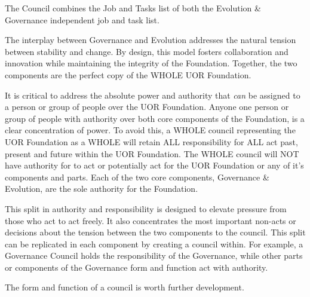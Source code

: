 \documentclass[twocolumn,10pt]{article}
\begin{document}
The Council combines the Job and Tasks list of both the Evolution \& Governance independent job and task list.

The interplay between Governance and Evolution addresses the natural tension between stability and change.
By design, this model fosters collaboration and innovation while maintaining the integrity of the Foundation.
Together, the two components are the perfect copy of the WHOLE UOR Foundation.

It is critical to address the absolute power and authority that \textit{can} be assigned to a person or group of people over the UOR Foundation.
Anyone one person or group of people with authority over both core components of the Foundation, is a clear concentration of power.
To avoid this, a WHOLE council representing the UOR Foundation as a WHOLE will retain ALL responsibility for ALL act past, present and future within the UOR Foundation.
The WHOLE council will NOT have authority for to act or potentially act for the UOR Foundation or any of it's components and parts.
Each of the two core components, Governance \& Evolution, are the sole authority for the Foundation.

This split in authority and responsibility is designed to elevate pressure from those who act to act freely.
It also concentrates the most important non-acts or decisions about the tension between the two components to the council.
This split can be replicated in each component by creating a council within.
For example, a Governance Council holds the responsibility of the Governance, while other parts or components of the Governance form and function act with authority.

The form and function of a council is worth further development.
\end{document}
